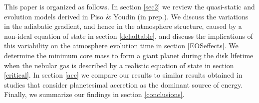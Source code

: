 \documentclass[apj]{emulateapj}
\begin{document}



This paper is organized as follows. In section \ref{sec2} we review the quasi-static and evolution models derived in Piso \& Youdin (in prep.). We discuss the variations in the adiabatic gradient, and hence in the atmosphere structure, caused by a non-ideal equation of state in section \ref{deladtable}, and discuss the implications of this variability on the atmosphere evolution time in section \ref{EOSeffects}. We determine the minimum core mass to form a giant planet during the disk lifetime when the nebular gas is described by a realistic equation of state in section \ref{critical}. In section \ref{acc} we compare our results to similar results obtained in studies that consider planetesimal accretion as the dominant source of energy. Finally, we summarize our findings in section \ref{conclusions}.
\end{document}

